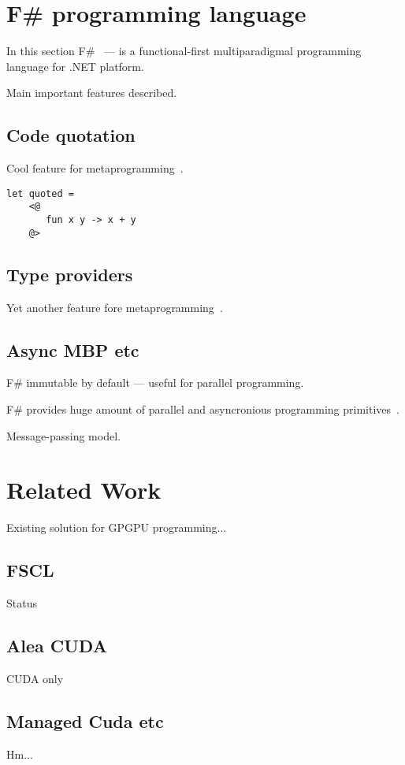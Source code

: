 \section{F\# programming language}

In this section F\#~\cite{fsharp} --- is a functional-first multiparadigmal programming language for .NET platform.

Main important features described.

\subsection{Code quotation}

Cool feature for metaprogramming~\cite{FSharpQuotations}.

\begin{lstlisting}[label=code_quotation_example,caption=Example of F\# code quotation]
let quoted = 
    <@
       fun x y -> x + y
    @>
\end{lstlisting}


\subsection{Type providers}

Yet another feature fore metaprogramming~\cite{FSharpTypeProvider1,FSharpTypeProvider2}.

\subsection{Async MBP etc}

F\# immutable by default --- useful for parallel programming.

F\# provides huge amount of parallel and asyncronious programming primitives~\cite{FSharpAsync}.

Message-passing model.

\section{Related Work}

Existing solution for GPGPU programming...

\subsection{FSCL}

Status~\cite{FSCLPhD}

\subsection{Alea CUDA}

CUDA only~\cite{AleaGPU}

\subsection{Managed Cuda etc}

Hm...